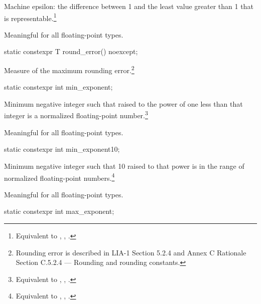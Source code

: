 \begin{itemdescr}
\pnum
Machine epsilon:  the difference between 1 and the least value greater than 1
that is representable.\footnote{Equivalent to , , .}

\pnum
Meaningful for all floating-point types.
\end{itemdescr}

%
\begin{itemdecl}
static constexpr T round_error() noexcept;
\end{itemdecl}

\begin{itemdescr}
\pnum
Measure of the maximum rounding error.\footnote{Rounding error is described in
LIA-1
Section 5.2.4 and
Annex C Rationale Section C.5.2.4 --- Rounding and rounding constants.}
\end{itemdescr}

%
\begin{itemdecl}
static constexpr int  min_exponent;
\end{itemdecl}

\begin{itemdescr}
\pnum
Minimum negative integer such that
raised to the power of one less than that integer is a normalized floating-point
number.\footnote{Equivalent to , ,
.}

\pnum
Meaningful for all floating-point types.
\end{itemdescr}

%
\begin{itemdecl}
static constexpr int  min_exponent10;
\end{itemdecl}

\begin{itemdescr}
\pnum
Minimum negative integer such that 10 raised to that power is in the range
of normalized floating-point numbers.\footnote{Equivalent to
, , .}

\pnum
Meaningful for all floating-point types.
\end{itemdescr}

%
\begin{itemdecl}
static constexpr int  max_exponent;
\end{itemdecl}

